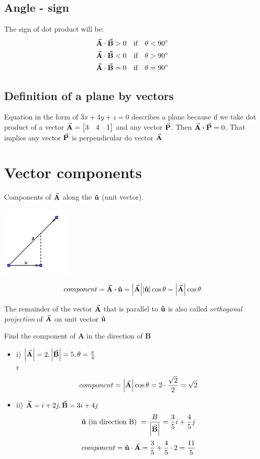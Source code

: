 \documentclass{article}
\begin{document}
    \subsection{Angle - sign}

    The sign of dot product will be:
    \begin{align}
        \va{A}\cdot\va{B}>0\qq{if}\theta<\ang{90}\\
        \va{A}\cdot\va{B}<0\qq{if}\theta>\ang{90}\\
        \va{A}\cdot\va{B}=0\qq{if}\theta=\ang{90}\\
    \end{align}


    \subsection{Definition of a plane by vectors}

    Equation in the form of $3x+4y+z=0$ describes a plane because if we take dot product of a vector $\va{A}=\bmqty{3&4&1}$ and any vector $\va{P}$. Then $\va{A}\vdot\va{P}=0$. That implies any vector $\va{P}$ is perpendicular do vector $\va{A}$

    \section{Vector components}

    Components of $\va{A}$ along the $\vu{u}$ (unit vector).

    \includegraphics[width=0.25\textwidth]{fig_3.png}

    \[component=\va{A}\vdot\vu{u}=\abs{\va{A}}\abs{\vu{u}}\cos{\theta}=\abs{\va{A}}\cos{\theta}\]

    The remainder of the vector $\va{A}$ that is parallel to $\vu{u}$ is also called \emph{orthogonal projection} of $\va{A}$ on unit vector $\vu{u}$

    \begin{problem}
        Find the component of \textbf{A} in the direction of \textbf{B}
        \begin{itemize}
            \item i) $\abs{\va{A}}=2, \abs{\va{B}}=5, \theta=\frac{\pi}{4}$\\r
            \[component=\abs{\va{A}}\cos{\theta}=2\cdot\frac{\sqrt{2}}{2}=\sqrt{2}\]
            \item ii) $\va{A}=i + 2j, \va{B}=3i+4j$
            \[\vu{u}\text{ (in direction B) }=\frac{B}{\abs{\va{B}}}=\frac{3}{5}i+\frac{4}{5}j\]
            \[component=\vu{u}\cdot\va{A}=\frac{3}{5}+\frac{4}{5}\cdot2=\frac{11}{5}\]
        \end{itemize}
    \end{problem}
\end{document}
